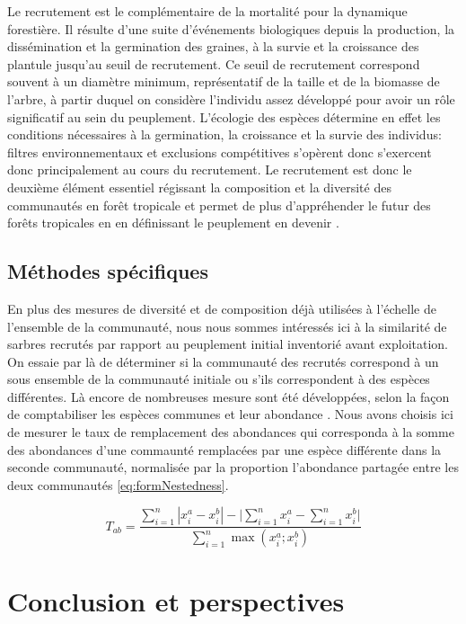 \documentclass[
  11pt,
  french,
  A4paper,
  extrafontsizes,onecolumn,openright
  ]{memoir}
\begin{document}
Le recrutement est le complémentaire de la mortalité pour la dynamique
forestière. Il résulte d'une suite d'événements biologiques depuis la
production, la dissémination et la germination des graines, à la survie
et la croissance des plantule jusqu'au seuil de recrutement. Ce seuil de
recrutement correspond souvent à un diamètre minimum, représentatif de
la taille et de la biomasse de l'arbre, à partir duquel on considère
l'individu assez développé pour avoir un rôle significatif au sein du
peuplement. L'écologie des espèces détermine en effet les conditions
nécessaires à la germination, la croissance et la survie des individus:
filtres environnementaux et exclusions compétitives s'opèrent donc
s'exercent donc principalement au cours du recrutement. Le recrutement
est donc le deuxième élément essentiel régissant la composition et la
diversité des communautés en forêt tropicale et permet de plus
d'appréhender le futur des forêts tropicales en en définissant le
peuplement en devenir \autocite[ + cf biblio Elodie]{Denslow1980}.

\section{Méthodes spécifiques}\label{methodes-specifiques}

En plus des mesures de diversité et de composition déjà utilisées à
l'échelle de l'ensemble de la communauté, nous nous sommes intéressés
ici à la similarité de sarbres recrutés par rapport au peuplement
initial inventorié avant exploitation. On essaie par là de déterminer si
la communauté des recrutés correspond à un sous ensemble de la
communauté initiale ou s'ils correspondent à des espèces différentes. Là
encore de nombreuses mesure sont été développées, selon la façon de
comptabiliser les espèces communes et leur abondance
\autocite{Podani2013a}. Nous avons choisis ici de mesurer le taux de
remplacement des abondances qui corresponda à la somme des abondances
d'une commaunté remplacées par une espèce différente dans la seconde
communauté, normalisée par la proportion l'abondance partagée entre les
deux communautés \eqref{eq:formNestedness}.

\begin{equation}
T_{ab}=\frac{\sum_{i=1}^{n}|x_i^a - x_i^b| - \bigg| \sum_{i=1}^{n}{x_i^a} - \sum_{i=1}^{n}{x_i^b} \bigg|}{\sum_{i=1}^{n}\max{\left( x_i^a;x_i^b \right)}}
\label{eq:formNestedness}
\end{equation}

\chapter{Conclusion et perspectives}\label{conclusion-et-perspectives}
\end{document}
